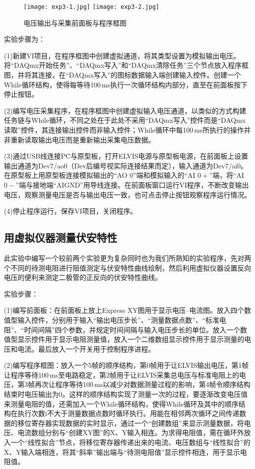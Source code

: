 \documentclass[UTF-8,twoside,cs4size]{ctexart}
\begin{document}
	\begin{figure}[p]
		\centering
		\texttt{[image: exp3-1.jpg]}
		\texttt{[image: exp3-2.jpg]}
		\caption{\small 电压输出与采集前面板与程序框图}
	\end{figure}

	实验步骤为：

	(1)新建VI项目，在程序框图中创建虚拟通道，将其类型设置为模拟输出电压。将“DAQmx开始任务”、“DAQmx写入”和“DAQmx清除任务”三个节点放入程序框图，并将其连接，在“DAQmx写入”的图标数据输入端创建输入控件。创建一个While循环结构，使得每等待100\,ms执行一次循环结构内部分，直至在前面板按下停止按钮。
	
	(2)编写电压采集程序，在程序框图中创建虚拟输入电压通道，以类似的方式构建任务链与While循环，不同之处在于此处不采用“DAQmx写入”控件而是“DAQmx读取”控件，其连接输出控件而非输入控件；While循环中每100\,ms所执行的操作并非重新读取输出电压而是重新输出采集电压数据。
	
	(3)通过USB线连接PC与原型板，打开ELVIS电源与原型板电源，在前面板上设置输出通道为Dev7/ao0（Dev后编号视实际连接结果而定），输入通道为Dev7/ai0。在原型板上用原型板连接模拟输出的“AO 0”端和模拟输入的“AI $ 0+ $”端，将“AI $ 0- $”端与接地端“AIGND”用导线连接。在前面板窗口运行VI程序，不断改变输出电压，观察测量电压是否与输出电压一致，也可点击停止按钮观察程序运行情况。
	
	(4)停止程序运行，保存VI项目，关闭程序。
	
	\subsection{用虚拟仪器测量伏安特性}
	此实验中编写一个较前两个实验更为复杂同时也为我们所熟知的实验程序，先对两个不同的待测电阻进行阻值测定与伏安特性曲线绘制，然后利用虚拟仪器设置反向电压的便利来测定二极管的正反向的伏安特性曲线。
	
	实验步骤：
	
	(1)编写前面板：在前面板上放上Express XY图用于显示电压--电流图。放入四个数值型输入控件，分别用于输入“输出电压步长”、“测量数据点数”、“标准电阻”、“时间间隔”四个参数，并规定时间间隔与输入电压步长的单位。放入一个数值型显示控件用于显示电阻测量值，放入一个二维数组显示控件用于显示测量的电压和电流。最后放入一个开关用于控制程序进程。
	
	(2)编写程序框图：放入一个5帧的顺序结构，第0帧用于让ELVIS输出电压，第1帧让程序等待100\,ms至电路稳定，第2帧用于让ELVIS采集总电压与标准电阻上的电压，第3帧再次让程序等待100\,ms以减少对数据测量过程的影响，第4帧令顺序结构结束时电压输出为0。这样的顺序结构实现了测量一次的过程，要逐渐改变电压值来测量电阻的值，还需加入一个While循环结构，使得While循环及其中的顺序结构在执行次数i不大于测量数据点数时循环执行。用能在相邻两次循环之间传递数据的移位寄存器实现数据的实时显示，通过一个“创建数组”来显示测量数据，将电压、电流数组分别与“创建XY图”的X、Y输入相连。为求得电阻值，需在循环外放入一个“线性拟合”节点，将移位寄存器传递出来的电流、电压数组与“线性拟合”的X、Y输入端相连，将其“斜率”输出端与“待测电阻值”显示控件相连，用于显示电阻值。
	
\end{document}
